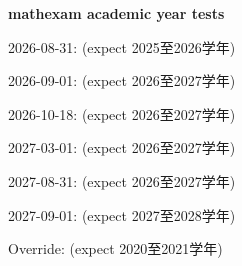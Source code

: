 \documentclass[zihao=-4]{article}
\begin{document}
\noindent\textbf{mathexam academic year tests}\par\medskip
{}\par
2026-08-31: \academicyearrange\quad (expect 2025至2026学年)\par\medskip
{}\par
2026-09-01: \academicyearrange\quad (expect 2026至2027学年)\par\medskip
{}\par
2026-10-18: \academicyearrange\quad (expect 2026至2027学年)\par\medskip
{}\par
2027-03-01: \academicyearrange\quad (expect 2026至2027学年)\par\medskip
{}\par
2027-08-31: \academicyearrange\quad (expect 2026至2027学年)\par\medskip
{}\par
2027-09-01: \academicyearrange\quad (expect 2027至2028学年)\par\medskip
{}\par
{}\par
Override: \academicyearrange\quad (expect 2020至2021学年)\par
\end{document}
